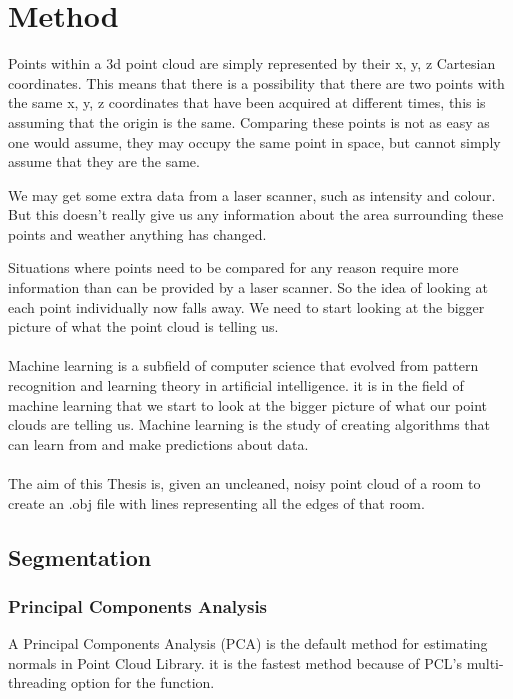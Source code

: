 
\chapter{Method}
	
	Points within a 3d point cloud are simply represented by their x, y, z Cartesian coordinates. This means that there is a possibility that there are two points with the same x, y, z coordinates that have been acquired at different times, this is assuming that the origin is the same. Comparing these points is not as easy as one would assume, they may occupy the same point in space, but cannot simply assume that they are the same.
	
	We may get some extra data from a laser scanner, such as intensity and colour. But this doesn't really give us any information about the area surrounding these points and weather anything has changed.
	
	Situations where points need to be compared for any reason require more information than can be provided by a laser scanner. So the idea of looking at each point individually now falls away. We need to start looking at the bigger picture of what the point cloud is telling us.\\
	\\
	Machine learning is a subfield of computer science that evolved from pattern recognition and learning theory in artificial intelligence. it is in the field of machine learning that we start to look at the bigger picture of what our point clouds are telling us. Machine learning is the study of creating algorithms that can learn from and make predictions about data.\\
	\\
	The aim of this Thesis is, given an uncleaned, noisy point cloud of a room to create an .obj file with lines representing all the edges of that room.
	
	
\section{Segmentation}
	\label{segmentation-method}
	\subsection{Principal Components Analysis}
		A Principal Components Analysis (PCA) is the default method for estimating normals in Point Cloud Library. it is the fastest method because of PCL's multi-threading option for the function.
		
